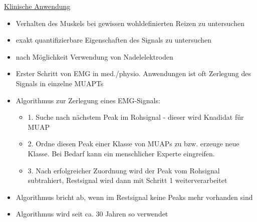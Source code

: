 \documentclass[a4paper,10pt,oneside]{article}
\begin{document}
\underline{Klinische Anwendung} \\
	\begin{itemize}
		\item Verhalten des Muskels bei gewissen wohldefinierten Reizen zu untersuchen
		\item exakt quantifizierbare Eigenschaften des Signals zu untersuchen
		\item nach Möglichkeit Verwendung von Nadelelektroden
		\item Erster Schritt von EMG in med./physio. Anwendungen ist oft Zerlegung des Signals in einzelne MUAPTs
		\item Algorithmus zur Zerlegung eines EMG-Signals:
			\begin{itemize}
				\item 1. Suche nach nächstem Peak im Rohsignal - dieser wird Knadidat für MUAP
				\item 2. Ordne diesen Peak einer Klasse von MUAPs zu bzw. erzeuge neue Klasse. Bei Bedarf kann ein menschlicher Experte eingreifen.
				\item 3. Nach erfolgreicher Zuordnung wird der Peak vom Rohsignal subtrahiert, Restsignal wird dann mit Schritt 1 weiterverarbeitet
			\end{itemize}
		\item Algorithmus bricht ab, wenn im Restsignal keine Peaks mehr vorhanden sind
		\item Algorithmus wird seit ca. 30 Jahren so verwendet
	\end{itemize}
	
\end{document}
